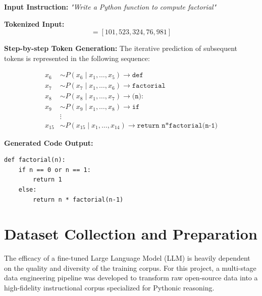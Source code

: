 \textbf{Input Instruction:}  
\textit{"Write a Python function to compute factorial"}

\textbf{Tokenized Input:}  
\begin{equation}
[x_1, x_2, x_3, x_4, x_5] = [101, 523, 324, 76, 981]
\end{equation}

\textbf{Step-by-step Token Generation:}  
The iterative prediction of subsequent tokens is represented in the following sequence:

\begin{equation}
\begin{aligned}
x_6 &\sim P(x_6 \mid x_1, \dots, x_5) \longrightarrow \texttt{def} \\
x_7 &\sim P(x_7 \mid x_1, \dots, x_6) \longrightarrow \texttt{factorial} \\
x_8 &\sim P(x_8 \mid x_1, \dots, x_7) \longrightarrow \texttt{(n):} \\
x_9 &\sim P(x_9 \mid x_1, \dots, x_8) \longrightarrow \texttt{if} \\
& \vdots \\
x_{15} &\sim P(x_{15} \mid x_1, \dots, x_{14}) \longrightarrow \texttt{return n*factorial(n-1)}
\end{aligned}
\end{equation}

\textbf{Generated Code Output:}
\begin{small}
\begin{verbatim}
def factorial(n):
    if n == 0 or n == 1:
        return 1
    else:
        return n * factorial(n-1)
\end{verbatim}
\end{small}


\section{Dataset Collection and Preparation}
The efficacy of a fine-tuned Large Language Model (LLM) is heavily dependent on the quality and diversity of the training corpus. For this project, a multi-stage data engineering pipeline was developed to transform raw open-source data into a high-fidelity instructional corpus specialized for Pythonic reasoning.

